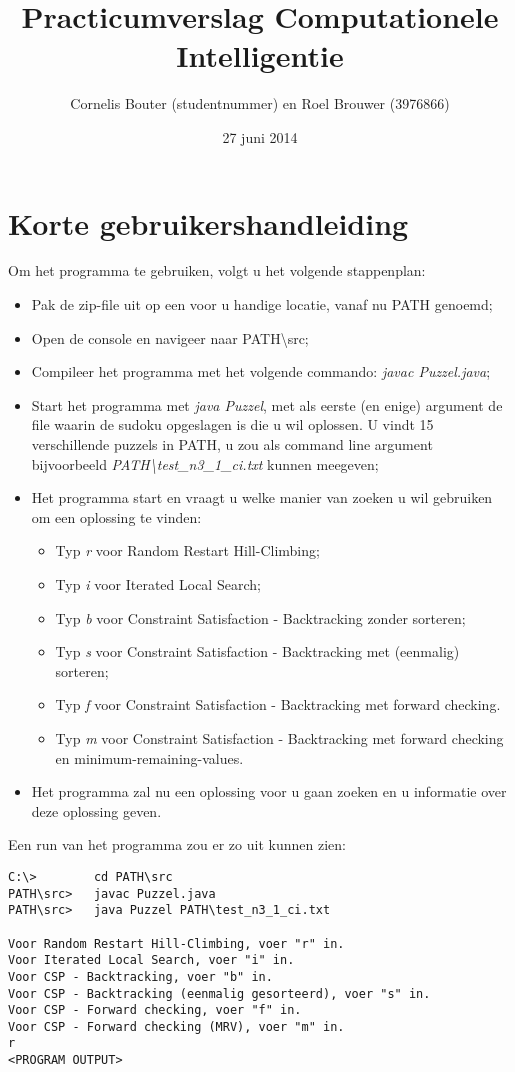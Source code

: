 \documentclass[]{report}
\title{Practicumverslag Computationele Intelligentie}
\author{Cornelis Bouter (studentnummer) en Roel Brouwer (3976866)}
\date{27 juni 2014}
\begin{document}
\maketitle

\chapter{Korte gebruikershandleiding}
Om het programma te gebruiken, volgt u het volgende stappenplan:
\begin{itemize}
\item Pak de zip-file uit op een voor u handige locatie, vanaf nu PATH genoemd;
\item Open de console en navigeer naar PATH\textbackslash src;
\item Compileer het programma met het volgende commando: \textit{javac Puzzel.java};
\item Start het programma met \textit{java Puzzel}, met als eerste (en enige) argument de file waarin de sudoku opgeslagen is die u wil oplossen. U vindt 15 verschillende puzzels in PATH, u zou als command line argument bijvoorbeeld \textit{PATH\textbackslash test\_n3\_1\_ci.txt} kunnen meegeven;
\item Het programma start en vraagt u welke manier van zoeken u wil gebruiken om een oplossing te vinden:
\begin{itemize}
\item Typ \textit{r} voor Random Restart Hill-Climbing;
\item Typ \textit{i} voor Iterated Local Search;
\item Typ \textit{b} voor Constraint Satisfaction - Backtracking zonder sorteren;
\item Typ \textit{s} voor Constraint Satisfaction - Backtracking met (eenmalig) sorteren;
\item Typ \textit{f} voor Constraint Satisfaction - Backtracking met forward checking.
\item Typ \textit{m} voor Constraint Satisfaction - Backtracking met forward checking en minimum-remaining-values.
\end{itemize}
\item Het programma zal nu een oplossing voor u gaan zoeken en u informatie over deze oplossing geven.
\end{itemize}
Een run van het programma zou er zo uit kunnen zien:

\begin{minipage}{\textwidth}
\begin{lstlisting}
C:\>		cd PATH\src
PATH\src>	javac Puzzel.java
PATH\src>	java Puzzel PATH\test_n3_1_ci.txt

Voor Random Restart Hill-Climbing, voer "r" in.
Voor Iterated Local Search, voer "i" in.
Voor CSP - Backtracking, voer "b" in.
Voor CSP - Backtracking (eenmalig gesorteerd), voer "s" in.
Voor CSP - Forward checking, voer "f" in.
Voor CSP - Forward checking (MRV), voer "m" in.
r
<PROGRAM OUTPUT>
\end{lstlisting}
\end{minipage}
\end{document}
